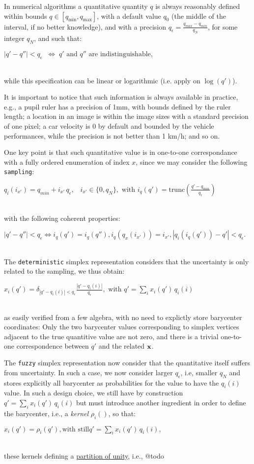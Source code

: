 \documentclass[a4,12pt]{article}
\newcommand{\eqline}[1]{\\\centerline{$#1$}\\}
\begin{document}
In numerical algorithms a quantitative quantity $q$ is always reasonably defined within bounds $q \in [q_{\min}, q_{\max}]$, with a default value $q_0$ (the middle of the interval, if no better knowledge), and with a precision $q_\epsilon = \frac{q_{max} - q_{min}}{q_N}$, for some integer $q_N$, and such that:
\eqline{|q' - q''| < q_\epsilon \;\;\Leftrightarrow\; \mbox{$q'$ and $q''$ are indistinguishable},}
while this specification can be linear or logarithmic (i.e. apply on $\log(q')$).

It is important to notice that such information is always available in practice, e.g., a pupil ruler has a precision of 1mm, with bounds defined by the ruler length; a location in an image is within the image sizes with a standard precision of one pixel; a car velocity is 0 by default and bounded by the vehicle performances, while the precision is not better than 1 km/h; and so on.

One key point is that such quantitative value is in one-to-one correspondance with a fully ordered enumeration of index $x$, since we may consider the following {\tt sampling}:
\eqline{q_i(i_{x'}) = q_{min} + i_{x'} \, q_\epsilon, \;\;\; i_{x'} \in \{0, q_N\}, \mbox{ with } i_q(q') = \mbox{trunc}\left(\frac{q' - q_{min}}{q_\epsilon}\right)}
with the following coherent properties:
\eqline{|q' - q''| < q_\epsilon \Leftrightarrow i_q(q') = i_q(q''), i_q(q_x(i_{x'})) = i_{x'}, |q_i(i_q(q')) - q'| <  q_\epsilon.}

The {\tt deterministic} simplex representation considers that the uncertainty is only related to the sampling, we thus obtain:
\eqline{x_i(q') = \delta_{|q' - q_i(i)| < q_\epsilon} \frac{|q' - q_i(i)|}{q_\epsilon},  \mbox{ with } q' = \sum_i x_i(q') \, q_i(i)}
as easily verified from a few algebra, with no need to explictly store barycenter coordinates: Only the two barycenter values corresponding to simplex vertices adjacent to the true quantitive value are not zero, and there is a trivial one-to-one correspondence between $q'$ and the related ${\bf x}$.

The {\tt fuzzy} simplex representation now consider that the quantitative itself suffers from uncertainty. In such a case, we now consider larger $q_\epsilon$, i.e, smaller $q_N$ and stores explicitly all barycenter as probabilities for the value to have the $q_i(i)$ value. In such a design choice, we still have by construction $q' = \sum_i x_i(q') \, q_i(i)$ but must introduce another ingredient in order to define the barycenter, i.e., a {\em kernel} $\rho_i()$, so that:
\eqline{x_i(q') = \rho_i(q'), \mbox{with still} q' = \sum_i x_i(q') \, q_i(i),}
these kernels defining a \href{https://en.wikipedia.org/wiki/Partition_of_unity}{partition of unity}, i.e., @todo
\end{document}
